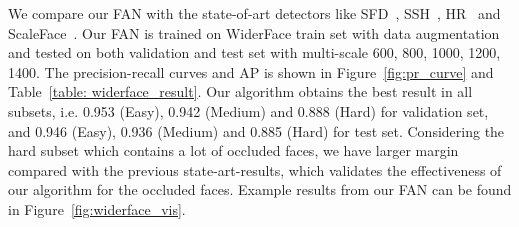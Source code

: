 \documentclass[10pt,twocolumn,letterpaper]{article}
\begin{document}
We compare our FAN with the state-of-art detectors like SFD~\cite{zhang2017s3fd}, SSH~\cite{najibi2017ssh}, HR~\cite{Hu_2017_CVPR} and ScaleFace~\cite{yang2017face}. Our FAN is trained on WiderFace train set with data augmentation and tested on both validation and test set with multi-scale {600, 800, 1000, 1200, 1400}. The precision-recall curves and AP is shown in Figure~\ref{fig:pr_curve} and Table~\ref{table: widerface_result}. Our algorithm obtains the best result in all subsets, i.e. 0.953 (Easy), 0.942 (Medium) and 0.888 (Hard) for validation set, and 0.946 (Easy), 0.936 (Medium) and 0.885 (Hard) for test set. Considering the hard subset which contains a lot of occluded faces, we have larger margin compared with the previous state-art-results, which validates the effectiveness of our algorithm for the occluded faces. Example results from our FAN can be found in Figure~\ref{fig:widerface_vis}.



\begin{table}[t]
\begin{center}
\end{center}
\caption{Comparison of FAN with state-of-art detectors on the test set of the WiderFace dataset.}
\label{table: widerface_result}
\end{table}
\end{document}
